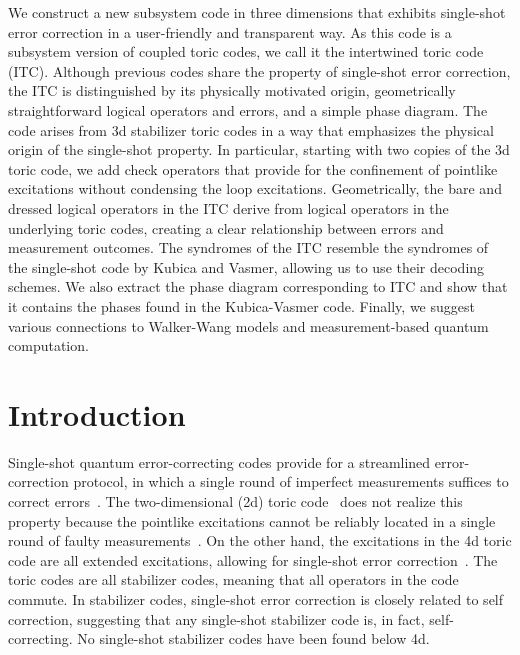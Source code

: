 We construct a new subsystem code in three dimensions that exhibits single-shot error correction in a user-friendly and transparent way. As this code is a subsystem version of coupled toric codes, we call it the intertwined toric code (ITC). Although previous codes share the property of single-shot error correction, the ITC is distinguished by its physically motivated origin, geometrically straightforward logical operators and errors, and a simple phase diagram. The code arises from 3d stabilizer toric codes in a way that emphasizes the physical origin of the single-shot property. In particular, starting with two copies of the 3d toric code, we add check operators that provide for the confinement of pointlike excitations without condensing the loop excitations. Geometrically, the bare and dressed logical operators in the ITC derive from logical operators in the underlying toric codes, creating a clear relationship between errors and measurement outcomes. The syndromes of the ITC resemble the syndromes of the single-shot code by Kubica and Vasmer, allowing us to use their decoding schemes. We also extract the phase diagram corresponding to ITC and show that it contains the phases found in the Kubica-Vasmer code. Finally, we suggest various connections to Walker-Wang models and measurement-based quantum computation.

%

\section{Introduction} \label{sec:intro}

Single-shot quantum error-correcting codes provide for a streamlined error-correction protocol, in which a single round of imperfect measurements suffices to correct errors~\cite{Bombin2015SingleShot}. The two-dimensional (2d) toric code~\cite{Kitaev2003Fault} does not realize this property because the pointlike excitations cannot be reliably located in a single round of faulty measurements~\cite{Dennis2002Topological}. On the other hand, the excitations in the 4d toric code are all extended excitations, allowing for single-shot error correction~\cite{Dennis2002Topological}. The toric codes are all stabilizer codes, meaning that all operators in the code commute. In stabilizer codes, single-shot error correction is closely related to self correction, suggesting that any single-shot stabilizer code is, in fact, self-correcting. No single-shot stabilizer codes have been found below 4d.

